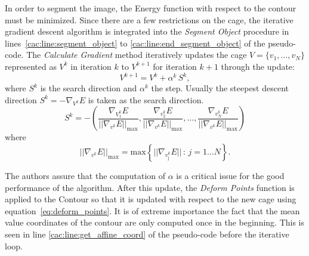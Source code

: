 In order to segment the image, the Energy function with respect to the contour must be minimized. Since there are a few restrictions on the cage, the iterative gradient descent algorithm is integrated into the \textit{Segment Object} procedure in lines~\ref{cac:line:segment_object} to \ref{cac:line:end_segment_object} of the pseudo-code. The \textit{Calculate Gradient} method iteratively updates the cage $V=\{v_1, \ldots, v_N \}$ represented as $V^k$  in iteration $k$ to $V^{k+1}$ for iteration $k+1$ through the update:
\begin{equation}
V^{k+1} = V^k + \alpha^k \, S^k,
\label{eq:update_cage}
\end{equation}
where $S^k$ is the search direction and $\alpha^k$ the step. Usually the
steepest descent direction $S^k = - \nabla_{V^k} E$
is taken as the
search direction.
\begin{equation}
S^k = - \left( \frac{\nabla_{V_1^k} E}{|| \nabla_{v^k} E ||_\mathrm{max}},
\frac{\nabla_{v_2^k} E}{|| \nabla_{v^k} E ||_\mathrm{max}},
\ldots,
\frac{\nabla_{v_N^k} E}{|| \nabla_{v^k} E ||_\mathrm{max}} \right)
\end{equation}
where 
\begin{equation}
|| \nabla_{v^k} E ||_\mathrm{max} = \mathrm{max} \left\{ || \nabla_{v_{\mathrm{j}}^k} E || \, : \, j = 1 \ldots N\right\}.
\end{equation}
%

The authors assure that the computation of $\alpha$ is a critical issue for the good performance of the algorithm.
After this update, the \textit{Deform Points} function is applied to the Contour so that it is updated with respect to the new cage using equation~\eqref{eq:deform_points}. It is of extreme importance the fact that the mean value coordinates of the contour are only computed once in the beginning. This is seen in line \ref{cac:line:get_affine_coord} of the pseudo-code before the iterative loop.


